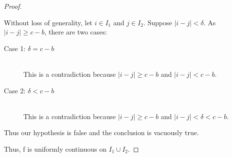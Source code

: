 \documentclass{article}
\begin{document}
\begin{proof}
\begin{description}
        Without loss of generality, let $i \in I_1$ and $j \in I_2$. Suppose
        $|i-j| < \delta$. As $|i-j| \geq c-b$, there are two cases:
        \begin{description}
          \item[Case 1: $\delta = c-b$] \hfill \\
            This is a contradiction because $|i-j| \geq c-b$ and $|i-j| < c-b$.
          \item[Case 2: $\delta < c-b$] \hfill \\
            This is a contradiction because $|i-j| \geq c-b$ and $|i-j| < 
            \delta < c-b$.
        \end{description}
        Thus our hypothesis is false and the conclusion is vacuously true.
    \end{description}
    Thus, f is uniformly continuous on $I_1 \cup I_2$.
  \end{proof}
\end{document}
